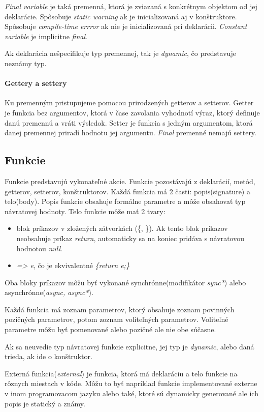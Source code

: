 \emph{Final variable} je taká premenná, ktorá je zviazaná s konkrétnym objektom od jej deklarácie. Spôsobuje \emph{static warning} ak je inicializovaná aj v konštruktore. Spôsobuje \emph{compile-time errror} ak nie je inicializovaná pri deklarácii.
\emph{Constant variable} je implicitne \emph{final}.

Ak deklarácia nešpecifikuje typ premennej, tak je \emph{dynamic}, čo predstavuje neznámy typ.

\paragraph{Gettery a settery}
\label{par:getters}
Ku premenným pristupujeme pomocou prirodzených getterov a setterov. 
Getter je funkcia bez argumentov, ktorá v čase zavolania vyhodnotí výraz, ktorý definuje danú premennú a vráti výsledok.
Setter je funkcia s jedným argumentom, ktorá danej premennej priradí hodnotu jej argumentu. \emph{Final} premenné nemajú settery.

\subsection{Funkcie}
Funkcie predstavujú vykonateľné akcie. Funkcie pozostávajú z deklarácií, metód, getterov, setterov, konštruktorov. %
Každá funkcia má 2 časti: popis(signature) a telo(body). Popis funkcie obsahuje formálne parametre a môže obsahovať typ návratovej hodnoty. Telo funkcie môže mať 2 tvary:
\begin{itemize}
\item blok príkazov v zložených zátvorkách (\{, \}). Ak tento blok príkazov neobsahuje príkaz \emph{return}, automaticky sa na koniec pridáva s návratovou hodnotou \emph{null}.
\item \emph{=> e}, čo je ekvivalentné \emph{\{return e;\}}
\end{itemize}
Oba bloky príkazov môžu byť vykonané synchrónne(modifikátor \emph{sync*}) alebo asynchrónne(\emph{async, async*}).

Každá funkcia má zoznam parametrov, ktorý obsahuje zoznam povinných pozičných parametrov, potom zoznam voliteľných parametrov. Voliteľné parametre môžu byť pomenované alebo pozičné ale nie obe súčasne.

Ak sa neuvedie typ návratovej funkcie explicitne, jej typ je \emph{dynamic}, alebo daná trieda, ak ide o konštruktor.

Externá funkcia(\emph{external}) je funkcia, ktorá má deklaráciu a telo funkcie na rôznych miestach v kóde. Môžu to byť napríklad funkcie implementované externe v inom programovacom jazyku alebo také, ktoré sú dynamicky generované ale ich popis je statický a známy.

